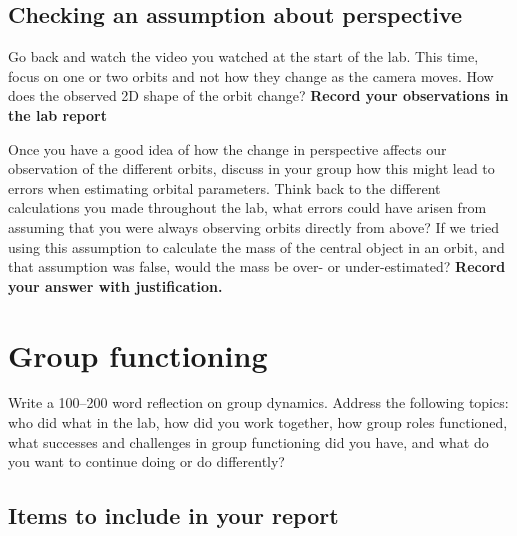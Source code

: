 \begin{steps}
\section{Checking an assumption about perspective}
	
	\item Go back and watch the video you watched at the start of the lab. This time, focus on one or two orbits and not how they change as the camera moves. How does the observed 2D shape of the orbit change? \textbf{Record your observations in the lab report}
	
	\item Once you have a good idea of how the change in perspective affects our observation of the different orbits, discuss in your group how this might lead to errors when estimating orbital parameters. Think back to the different calculations you made throughout the lab, what errors could have arisen from assuming that you were always observing orbits directly from above? If we tried using this assumption to calculate the mass of the central object in an orbit, and that assumption was false, would the mass be over- or under-estimated? \textbf{Record your answer with justification.}
\end{steps}

\section{Group functioning}

\begin{steps}
	\item Write a 100--200 word reflection on group dynamics. Address the following topics: who did what in the lab, how did you work together, how group roles functioned, what successes and challenges in group functioning did you have, and what do you want to continue doing or do differently?
\end{steps}

\subsection{Items to include in your report}

